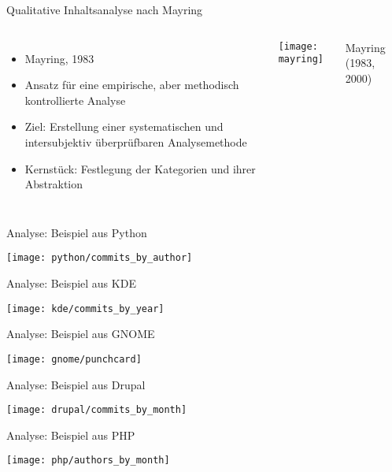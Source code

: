 \documentclass[11pt]{beamer}
\newlength{\colwidth}
\begin{document}
\begin{frame}[t]{Qualitative Inhaltsanalyse nach Mayring}
  \begin{columns}[T]
  \column{\colwidth}
    \begin{itemize}
      \item Mayring, 1983
      \item Ansatz für eine empirische, aber methodisch kontrollierte Analyse
      \item Ziel: Erstellung einer systematischen und intersubjektiv überprüfbaren Analysemethode
      \item Kernstück: Festlegung der Kategorien und ihrer Abstraktion
    \end{itemize}
  \column{\colwidth}
    \texttt{[image: mayring]}

    {\tiny\hfill
    Mayring (1983, 2000)
    }
  \end{columns}
\end{frame}

\begin{frame}{Analyse: Beispiel aus Python}
  \begin{center}
    \texttt{[image: python/commits\_by\_author]}
  \end{center}
\end{frame}

\begin{frame}{Analyse: Beispiel aus KDE}
  \begin{center}
    \texttt{[image: kde/commits\_by\_year]}
  \end{center}
\end{frame}

\begin{frame}{Analyse: Beispiel aus GNOME}
  \begin{center}
    \texttt{[image: gnome/punchcard]}
  \end{center}
\end{frame}

\begin{frame}{Analyse: Beispiel aus Drupal}
  \begin{center}
    \texttt{[image: drupal/commits\_by\_month]}
  \end{center}
\end{frame}

\begin{frame}{Analyse: Beispiel aus PHP}
  \begin{center}
    \texttt{[image: php/authors\_by\_month]}
  \end{center}
\end{frame}
\end{document}
